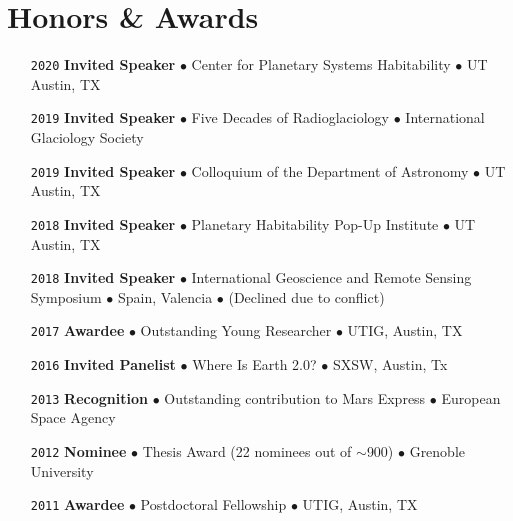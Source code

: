 \section*{Honors \& Awards}
\vspace{-.5em}

\begin{itemize}[leftmargin=3.8em, labelsep=1.5em]
    \setlength\itemsep{-.5em}
    \item[\texttt{2020}] \textbf{Invited Speaker} $\bullet$ Center for Planetary Systems Habitability $\bullet$ UT Austin, TX
    \item[\texttt{2019}] \textbf{Invited Speaker} $\bullet$ Five Decades of Radioglaciology $\bullet$ International Glaciology Society
    \item[\texttt{2019}] \textbf{Invited Speaker} $\bullet$ Colloquium of the Department of Astronomy $\bullet$ UT Austin, TX
    \item[\texttt{2018}] \textbf{Invited Speaker} $\bullet$ Planetary Habitability Pop-Up Institute $\bullet$ UT Austin, TX
    \item[\texttt{2018}] \textbf{Invited Speaker} $\bullet$ International Geoscience and Remote Sensing Symposium $\bullet$ Spain, Valencia $\bullet$ (Declined due to conflict)
    \item[\texttt{2017}] \textbf{Awardee} $\bullet$ Outstanding Young Researcher $\bullet$ UTIG, Austin, TX
    \item[\texttt{2016}] \textbf{Invited Panelist} $\bullet$ Where Is Earth 2.0? $\bullet$ SXSW, Austin, Tx
    \item[\texttt{2013}] \textbf{Recognition} $\bullet$ Outstanding contribution to Mars Express $\bullet$ European Space Agency
    \item[\texttt{2012}] \textbf{Nominee} $\bullet$ Thesis Award (22 nominees out of $\sim$900) $\bullet$ Grenoble University
    \item[\texttt{2011}] \textbf{Awardee} $\bullet$ Postdoctoral Fellowship $\bullet$ UTIG, Austin, TX
\end{itemize}
